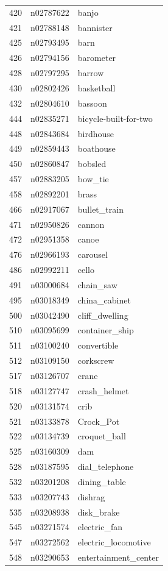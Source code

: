 \begin{table}
\begin{tabular}{cll}
420 & n02787622 & banjo \\
421 & n02788148 & bannister \\
425 & n02793495 & barn \\
426 & n02794156 & barometer \\
428 & n02797295 & barrow \\
430 & n02802426 & basketball \\
432 & n02804610 & bassoon \\
444 & n02835271 & bicycle-built-for-two \\
448 & n02843684 & birdhouse \\
449 & n02859443 & boathouse \\
450 & n02860847 & bobsled \\
457 & n02883205 & bow_tie \\
458 & n02892201 & brass \\
466 & n02917067 & bullet_train \\
471 & n02950826 & cannon \\
472 & n02951358 & canoe \\
476 & n02966193 & carousel \\
486 & n02992211 & cello \\
491 & n03000684 & chain_saw \\
495 & n03018349 & china_cabinet \\
500 & n03042490 & cliff_dwelling \\
510 & n03095699 & container_ship \\
511 & n03100240 & convertible \\
512 & n03109150 & corkscrew \\
517 & n03126707 & crane \\
518 & n03127747 & crash_helmet \\
520 & n03131574 & crib \\
521 & n03133878 & Crock_Pot \\
522 & n03134739 & croquet_ball \\
525 & n03160309 & dam \\
528 & n03187595 & dial_telephone \\
532 & n03201208 & dining_table \\
533 & n03207743 & dishrag \\
535 & n03208938 & disk_brake \\
545 & n03271574 & electric_fan \\
547 & n03272562 & electric_locomotive \\
548 & n03290653 & entertainment_center \\

\end{tabular}
\end{table}
